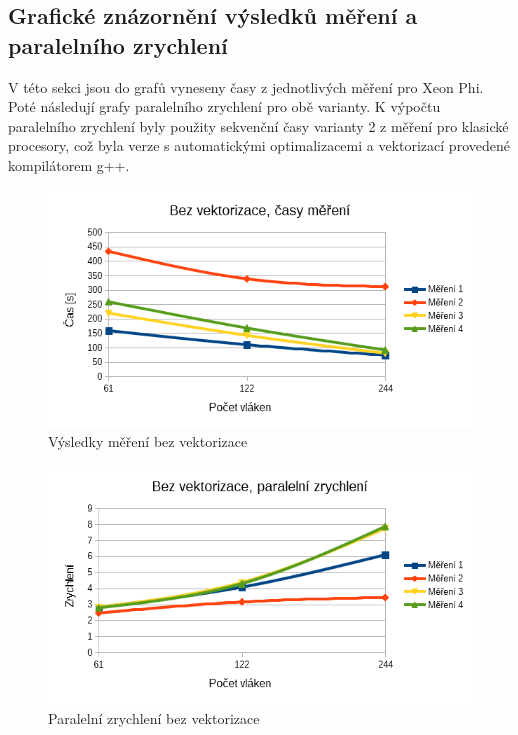 \documentclass[12pt]{article}
\begin{document}
\subsection{Grafické znázornění výsledků měření a paralelního zrychlení}
V této sekci jsou do grafů vyneseny časy z jednotlivých měření pro Xeon Phi.
Poté následují grafy paralelního zrychlení pro obě varianty.
K výpočtu paralelního zrychlení byly použity sekvenční časy varianty 2 z měření pro klasické procesory,
což byla verze s automatickými optimalizacemi a vektorizací provedené kompilátorem g++.
%
%
\begin{figure}[H]
  \begin{center}
      \includegraphics[width=12cm]{images/sdruzene/phi/novectime.png}
    \caption{Výsledky měření bez vektorizace}
  \end{center}
\end{figure}
%
%
\begin{figure}[H]
  \begin{center}
      \includegraphics[width=12cm]{images/sdruzene/phi/novecacc.png}	
    \caption{Paralelní zrychlení bez vektorizace}
  \end{center}
\end{figure}
\end{document}

